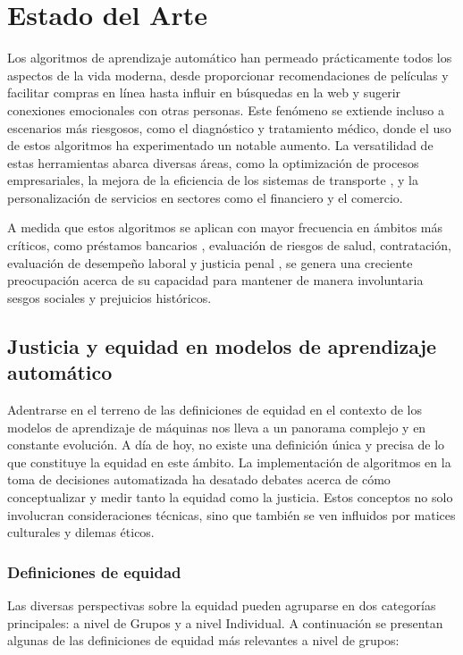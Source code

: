 \chapter{Estado del Arte}\label{chapter:state-of-the-art}

Los algoritmos de aprendizaje autom\'atico han permeado pr\'acticamente todos los aspectos de la vida moderna,
desde proporcionar recomendaciones de pel\'iculas y facilitar compras en l\'inea hasta influir en b\'usquedas en la web
y sugerir conexiones emocionales con otras personas. Este fen\'omeno se extiende incluso a escenarios m\'as riesgosos,
como el diagn\'ostico y tratamiento m\'edico, donde el uso de estos algoritmos ha experimentado un notable aumento.
La versatilidad de estas herramientas abarca diversas \'areas, como la optimizaci\'on de procesos empresariales, la 
mejora de la eficiencia de los sistemas de transporte \cite{autonomous_driving}, y la personalizaci\'on de servicios en 
sectores como el financiero y el comercio.

A medida que estos algoritmos se aplican con mayor frecuencia en \'ambitos m\'as cr\'iticos, como
pr\'estamos bancarios \cite{fairness_def}, evaluaci\'on de riesgos de salud, contrataci\'on, evaluaci\'on de desempe\~no laboral y
justicia penal \cite{compas}, se genera una creciente preocupaci\'on acerca de su capacidad para mantener de manera involuntaria 
sesgos sociales y prejuicios hist\'oricos. 

\section{Justicia y equidad en modelos de aprendizaje autom\'atico}

Adentrarse en el terreno de las definiciones de equidad en el contexto de los modelos de aprendizaje de m\'aquinas nos lleva 
a un panorama complejo y en constante evoluci\'on. A d\'ia de hoy, no existe una definici\'on \'unica y precisa
de lo que constituye la equidad en este \'ambito. La implementaci\'on de algoritmos en la toma de decisiones automatizada ha desatado 
debates acerca de c\'omo conceptualizar y medir tanto la equidad como la justicia. Estos conceptos no solo involucran consideraciones 
t\'ecnicas, sino que tambi\'en se ven influidos por matices culturales y dilemas \'eticos.

\subsection{Definiciones de equidad}
Las diversas perspectivas sobre la equidad pueden agruparse en dos categor\'ias principales: a nivel de Grupos y a nivel Individual. 
A continuaci\'on se presentan algunas de las definiciones de equidad m\'as relevantes a nivel de grupos:

